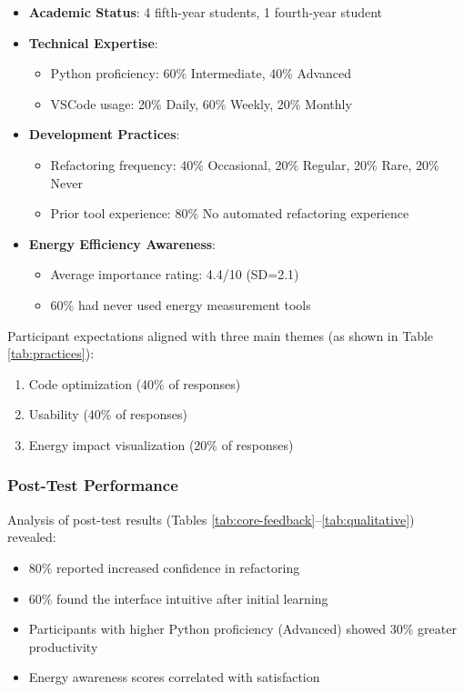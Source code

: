 \documentclass{article}
\begin{document}
\begin{itemize}
    \item \textbf{Academic Status}: 4 fifth-year students, 1 fourth-year student
    \item \textbf{Technical Expertise}:
    \begin{itemize}
        \item Python proficiency: 60\% Intermediate, 40\% Advanced
        \item VSCode usage: 20\% Daily, 60\% Weekly, 20\% Monthly
    \end{itemize}
    
    \item \textbf{Development Practices}:
    \begin{itemize}
        \item Refactoring frequency: 40\% Occasional, 20\% Regular, 20\% Rare, 20\% Never
        \item Prior tool experience: 80\% No automated refactoring experience
    \end{itemize}
    
    \item \textbf{Energy Efficiency Awareness}:
    \begin{itemize}
        \item Average importance rating: 4.4/10 (SD=2.1)
        \item 60\% had never used energy measurement tools
    \end{itemize}
\end{itemize}

\noindent Participant expectations aligned with three main themes (as shown in Table \ref{tab:practices}):
\begin{enumerate}
    \item Code optimization (40\% of responses)
    \item Usability (40\% of responses) 
    \item Energy impact visualization (20\% of responses)
\end{enumerate}

\subsubsection{Post-Test Performance}
Analysis of post-test results (Tables \ref{tab:core-feedback}--\ref{tab:qualitative}) revealed:
\begin{itemize}
    \item 80\% reported increased confidence in refactoring
    \item 60\% found the interface intuitive after initial learning
    \item Participants with higher Python proficiency (Advanced) showed 30\% greater productivity
    \item Energy awareness scores correlated with satisfaction 
\end{itemize}
\end{document}
